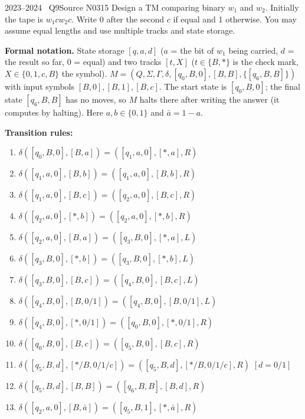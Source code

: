 \documentclass[11pt,a4paper]{article}
\begin{document}
\begin{question}{2023--2024 \textbullet\ Q9}{Source N03}{15}
Design a TM comparing binary $w_1$ and $w_2$. Initially the tape is $w_1cw_2c$. Write 0 after the second $c$ if equal and 1 otherwise. You may assume equal lengths and use multiple tracks and state storage.
\end{question}
\begin{solution}
\textbf{Formal notation.} State storage $[q,a,d]$ ($a$ = the bit of $w_1$ being carried, $d$ = the result so far, $0$ = equal) and two tracks $[t,X]$ ($t\in\{B,\ast\}$ is the check mark, $X\in\{0,1,c,B\}$ the symbol). $M=(Q,\Sigma,\Gamma,\delta,[q_0,B,0],[B,B],\{[q_6,B,B]\})$ with input symbols $[B,0],[B,1],[B,c]$. The start state is $[q_0,B,0]$; the final state $[q_6,B,B]$ has no moves, so $M$ halts there after writing the answer (it computes by halting). Here $a,b\in\{0,1\}$ and $\bar a=1-a$.
\par\noindent\textbf{Transition rules:}
{\small\begin{enumerate}[label=\arabic*.,itemsep=0pt]
\item $\delta([q_0,B,0],[B,a])=([q_1,a,0],[\ast,a],R)$
\item $\delta([q_1,a,0],[B,b])=([q_1,a,0],[B,b],R)$
\item $\delta([q_1,a,0],[B,c])=([q_2,a,0],[B,c],R)$
\item $\delta([q_2,a,0],[\ast,b])=([q_2,a,0],[\ast,b],R)$
\item $\delta([q_2,a,0],[B,a])=([q_3,B,0],[\ast,a],L)$
\item $\delta([q_3,B,0],[\ast,b])=([q_3,B,0],[\ast,b],L)$
\item $\delta([q_3,B,0],[B,c])=([q_4,B,0],[B,c],L)$
\item $\delta([q_4,B,0],[B,0/1])=([q_4,B,0],[B,0/1],L)$
\item $\delta([q_4,B,0],[\ast,0/1])=([q_0,B,0],[\ast,0/1],R)$
\item $\delta([q_0,B,0],[B,c])=([q_5,B,0],[B,c],R)$
\item $\delta([q_5,B,d],[\ast/B,0/1/c])=([q_5,B,d],[\ast/B,0/1/c],R)$ \quad $[d=0/1]$
\item $\delta([q_5,B,d],[B,B])=([q_6,B,B],[B,d],R)$
\item $\delta([q_2,a,0],[B,\bar a])=([q_5,B,1],[\ast,\bar a],R)$
\end{enumerate}}
\end{solution}
\end{document}
